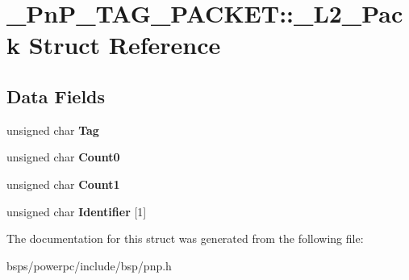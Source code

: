 \hypertarget{struct__PnP__TAG__PACKET_1_1__L2__Pack}{}\section{\+\_\+\+Pn\+P\+\_\+\+T\+A\+G\+\_\+\+P\+A\+C\+K\+ET\+::\+\_\+\+L2\+\_\+\+Pack Struct Reference}
\label{struct__PnP__TAG__PACKET_1_1__L2__Pack}
\subsection*{Data Fields}
\begin{DoxyCompactItemize}
\item 
\mbox{\label{struct__PnP__TAG__PACKET_1_1__L2__Pack_a3f3b87227eb7126778f249c2c37f07f5}} 
unsigned char {\bfseries Tag}
\item 
\mbox{\label{struct__PnP__TAG__PACKET_1_1__L2__Pack_acc0b1966cf9c89faa26787ff5902e3bb}} 
unsigned char {\bfseries Count0}
\item 
\mbox{\label{struct__PnP__TAG__PACKET_1_1__L2__Pack_ae24f72c5fa967cfd4366ed667a8be87f}} 
unsigned char {\bfseries Count1}
\item 
\mbox{\label{struct__PnP__TAG__PACKET_1_1__L2__Pack_a173d537ee03a8b991f014aeafb009275}} 
unsigned char {\bfseries Identifier} \mbox{[}1\mbox{]}
\end{DoxyCompactItemize}


The documentation for this struct was generated from the following file\+:\begin{DoxyCompactItemize}
\item 
bsps/powerpc/include/bsp/pnp.\+h\end{DoxyCompactItemize}
